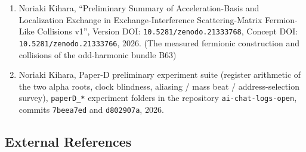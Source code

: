 \documentclass[
  a4paper,
]{article}
\begin{document}
\begin{enumerate}
\item
  Noriaki Kihara, ``Preliminary Summary of Acceleration-Basis and
  Localization Exchange in Exchange-Interference Scattering-Matrix
  Fermion-Like Collisions v1'', Version DOI:
  \texttt{10.5281/zenodo.21333768}, Concept DOI:
  \texttt{10.5281/zenodo.21333766}, 2026. (The measured fermionic
  construction and collisions of the odd-harmonic bundle B63)
\item
  Noriaki Kihara, Paper-D preliminary experiment suite (register
  arithmetic of the two alpha roots, clock blindness, aliasing / mass
  beat / address-selection survey), \texttt{paperD\_*} experiment
  folders in the repository \texttt{ai-chat-logs-open}, commits
  \texttt{7beea7ed} and \texttt{d802907a}, 2026.
\end{enumerate}

\subsection{External References}\label{external-references}
\end{document}
